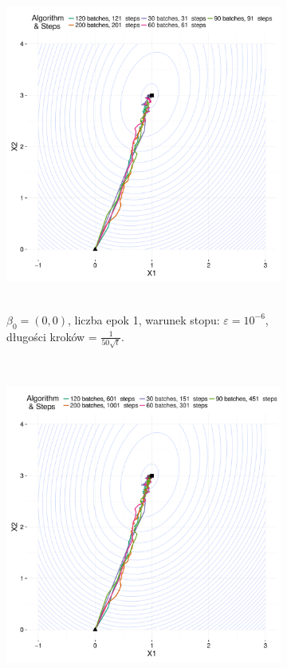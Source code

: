 \begin{figure}[hbt!]
  \begin{center}
   \begin{subfigure}[h!]{0.9\textwidth}
      \includegraphics[width=\textwidth, height=310pt]{Obrazki/b_0_0_iter_1_e-6_50sqrt.pdf}
      \caption{$\beta_0=(0,0)$, liczba epok 1, warunek stopu: $\varepsilon=10^{-6}$, długości kroków = $\frac{1}{50\sqrt{t}}$.}
   \end{subfigure}     
   \begin{subfigure}[h!]{0.9\textwidth}
      \includegraphics[width=\textwidth, height=310pt]{Obrazki/b_0_0_iter_5_e-6_50sqrt.pdf}

\end{subfigure}
\end{center}
\end{figure}
